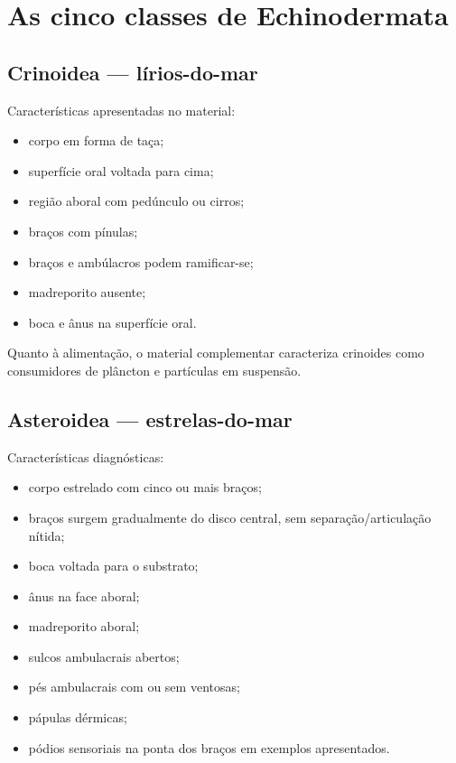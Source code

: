 \documentclass[a4paper,12pt]{article}
\begin{document}
\section{As cinco classes de Echinodermata}

\subsection{Crinoidea — lírios-do-mar}

Características apresentadas no material:

\begin{itemize}
  \item corpo em forma de taça;
  \item superfície oral voltada para cima;
  \item região aboral com pedúnculo ou cirros;
  \item braços com pínulas;
  \item braços e ambúlacros podem ramificar-se;
  \item madreporito ausente;
  \item boca e ânus na superfície oral.
\end{itemize}

Quanto à alimentação, o material complementar caracteriza crinoides como consumidores de plâncton e partículas em suspensão.

\subsection{Asteroidea — estrelas-do-mar}

Características diagnósticas:

\begin{itemize}
  \item corpo estrelado com cinco ou mais braços;
  \item braços surgem gradualmente do disco central, sem separação/articulação nítida;
  \item boca voltada para o substrato;
  \item ânus na face aboral;
  \item madreporito aboral;
  \item sulcos ambulacrais abertos;
  \item pés ambulacrais com ou sem ventosas;
  \item pápulas dérmicas;
  \item pódios sensoriais na ponta dos braços em exemplos apresentados.
\end{itemize}
\end{document}
